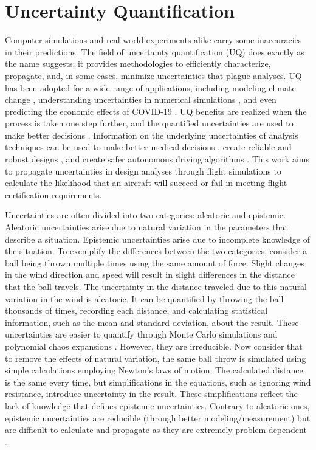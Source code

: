 \section{Uncertainty Quantification} \label{intro_uq}

Computer simulations and real-world experiments alike carry some inaccuracies in their predictions. 
The field of uncertainty quantification (UQ) does exactly as the name suggests; it provides methodologies to efficiently characterize, propagate, and, in some cases, minimize uncertainties that plague analyses.
UQ has been adopted for a wide range of applications, including modeling climate change \cite{katz2013uncertainty,qian2016uncertainty}, understanding uncertainties in numerical simulations \cite{najm2009uncertainty,garcia2014quantifying,schefzik2013uncertainty}, and even predicting the economic effects of COVID-19 \cite{baker2020covid}.
UQ benefits are realized when the process is taken one step further, and the quantified uncertainties are used to make better decisions \cite{kochenderfer2015decision}. 
Information on the underlying uncertainties of analysis techniques can be used to make better medical decisions \cite{begoli2019need}, create reliable and robust designs \cite{reliability,robust,multif}, and create safer autonomous driving algorithms \cite{feng2018towards,brechtel2014probabilistic,xu2014motion}.
This work aims to propagate uncertainties in design analyses through flight simulations to calculate the likelihood that an aircraft will succeed or fail in meeting flight certification requirements.

Uncertainties are often divided into two categories: aleatoric and epistemic.
Aleatoric uncertainties arise due to natural variation in the parameters that describe a situation.
Epistemic uncertainties arise due to incomplete knowledge of the situation. 
To exemplify the differences between the two categories, consider a ball being thrown multiple times using the same amount of force. 
Slight changes in the wind direction and speed will result in slight differences in the distance that the ball travels. 
The uncertainty in the distance traveled due to this natural variation in the wind is aleatoric.
It can be quantified by throwing the ball thousands of times, recording each distance, and calculating statistical information, such as the mean and standard deviation, about the result.
These uncertainties are easier to quantify through Monte Carlo simulations \cite{geraci_multifidelity_2017,menhorn_multifideliy_nodate} and  polynomial chaos expansions \cite{oladyshkin2012data,ng_multifidelity_2014}.
However, they are irreducible. 
Now consider that to remove the effects of natural variation, the same ball throw is simulated using simple calculations employing Newton's laws of motion.
The calculated distance is the same every time, but simplifications in the equations, such as ignoring wind resistance, introduce uncertainty in the result.
These simplifications reflect the lack of knowledge that defines epistemic uncertainties.
Contrary to aleatoric ones, epistemic uncertainties are reducible (through better modeling/measurement) but are difficult to calculate and propagate as they are extremely problem-dependent \cite{FERSON2004355}.

